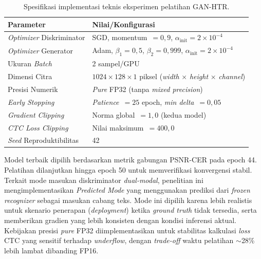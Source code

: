 \begin{table}[!htbp]
  \caption[Spesifikasi implementasi teknis pelatihan]{Spesifikasi implementasi teknis eksperimen pelatihan GAN-HTR.}
  \label{tab:spesifikasi-implementasi}
  \small

  \renewcommand{\arraystretch}{1.2}
  \begin{tabular}{|l|p{8.5cm}|}
    \hline
    \textbf{Parameter}                        & \textbf{Nilai/Konfigurasi}                                                                         \\
    \hline
    \textit{Optimizer} Diskriminator          & SGD, momentum~$=0,9$, $\alpha_{\text{init}}=2\times10^{-4}$                                        \\
    \hline
    \textit{Optimizer} Generator              & Adam, $\beta_1=0,5$, $\beta_2=0,999$, $\alpha_{\text{init}}=2\times10^{-4}$                         \\
    \hline
    Ukuran \textit{Batch}                     & 2 sampel/GPU                                                                 \\
    \hline
    Dimensi Citra                             & $1024 \times 128 \times 1$ piksel (\textit{width} $\times$ \textit{height} $\times$ \textit{channel}) \\
    \hline
    Presisi Numerik                           & \textit{Pure} FP32 (tanpa \textit{mixed precision})                                                \\
    \hline
    \textit{Early Stopping}                   & \textit{Patience}~$=25$ epoch, \textit{min delta}~$=0,05$                                          \\
    \hline
    \textit{Gradient Clipping}                & Norma global~$=1,0$ (kedua model)                                                                  \\
    \hline
    \textit{CTC Loss Clipping}                & Nilai maksimum~$=400,0$                                                                            \\
    \hline
    \textit{Seed} Reproduktibilitas           & 42                                                                                                  \\
    \hline
  \end{tabular}
\end{table}

Model terbaik dipilih berdasarkan metrik gabungan PSNR-CER pada epoch 44. Pelatihan dilanjutkan hingga epoch 50 untuk memverifikasi konvergensi stabil. Terkait mode masukan diskriminator \textit{dual-modal}, penelitian ini mengimplementasikan \textit{Predicted Mode} yang menggunakan prediksi dari \textit{frozen recognizer} sebagai masukan cabang teks. Mode ini dipilih karena lebih realistis untuk skenario penerapan (\textit{deployment}) ketika \textit{ground truth} tidak tersedia, serta memberikan gradien yang lebih konsisten dengan kondisi inferensi aktual. Kebijakan presisi \textit{pure} FP32 diimplementasikan untuk stabilitas kalkulasi \textit{loss} CTC yang sensitif terhadap \textit{underflow}, dengan \textit{trade-off} waktu pelatihan $\sim$28\% lebih lambat dibanding FP16.

